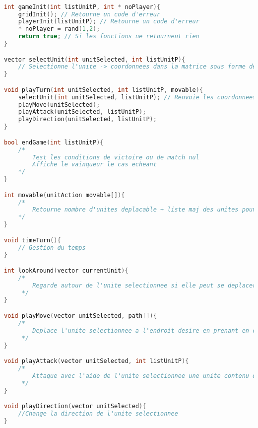 \documentclass[a4paper,10pt]{extreport}
\begin{document}
\begin{lstlisting}[language=c]

int gameInit(int listUnitP, int * noPlayer){
	gridInit(); // Retourne un code d'erreur
	playerInit(listUnitP); // Retourne un code d'erreur
	* noPlayer = rand(1,2);
	return true; // Si les fonctions ne retournent rien
}

vector selectUnit(int unitSelected, int listUnitP){
	// Selectionne l'unite -> coordonnees dans la matrice sous forme de vecteur
}

void playTurn(int unitSelected, int listUnitP, movable){
	selectUnit(int unitSelected, listUnitP); // Renvoie les coordonnees de l'unite selectionnee
	playMove(unitSelected);
	playAttack(unitSelected, listUnitP);
	playDirection(unitSelected, listUnitP);
}

bool endGame(int listUnitP){
	/* 	
		Test les conditions de victoire ou de match nul
	 	Affiche le vainqueur le cas echeant
	*/
}

int movable(unitAction movable[]){
	/* 	
		Retourne nombre d'unites deplacable + liste maj des unites pouvant se deplacer
	*/
}

void timeTurn(){
	// Gestion du temps
}

int lookAround(vector currentUnit){
	/*
		Regarde autour de l'unite selectionnee si elle peut se deplacer sur une case si TP pas permise alors deplacement impossible
	 */
}

void playMove(vector unitSelected, path[]){
	/*
		Deplace l'unite selectionnee a l'endroit desire en prenant en compte les chemins possibles
	 */
}

void playAttack(vector unitSelected, int listUnitP){
	/*
		Attaque avec l'aide de l'unite selectionnee une unite contenu dans la liste listUnitP
	 */
}

void playDirection(vector unitSelected){
	//Change la direction de l'unite selectionnee
}

\end{lstlisting}
\end{document}
